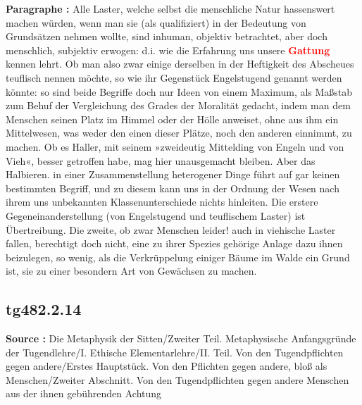 \documentclass[a4paper,12pt,twoside]{book}
\newcommand{\match}[1]{\textcolor{red}{\textbf{#1}}}
\begin{document}
	\textbf{Paragraphe : }Alle Laster, welche selbst die menschliche Natur hassenswert machen würden, wenn man sie (als qualifiziert) in der Bedeutung von Grundsätzen nehmen wollte, sind inhuman, objektiv betrachtet, aber doch menschlich, subjektiv erwogen: d.i. wie die Erfahrung uns unsere \match{Gattung} kennen lehrt. Ob man also zwar einige derselben in der Heftigkeit des Abscheues teuflisch nennen möchte, so wie ihr Gegenstück Engelstugend genannt werden könnte: so sind beide Begriffe doch nur Ideen von einem Maximum, als Maßstab zum Behuf der Vergleichung des Grades der Moralität gedacht, indem man dem Menschen seinen Platz im Himmel oder der Hölle anweiset, ohne aus ihm ein Mittelwesen, was weder den einen dieser Plätze, noch den anderen einnimmt, zu machen. Ob es Haller, mit seinem »zweideutig Mittelding von Engeln und von Vieh«, besser getroffen habe, mag hier unausgemacht bleiben. Aber das Halbieren. in einer Zusammenstellung heterogener Dinge führt auf gar keinen bestimmten Begriff, und zu diesem kann uns in der Ordnung der Wesen nach ihrem uns unbekannten Klassenunterschiede nichts hinleiten. Die erstere Gegeneinanderstellung (von Engelstugend und teuflischem  Laster) ist Übertreibung. Die zweite, ob zwar Menschen leider! auch in viehische Laster fallen, berechtigt doch nicht, eine zu ihrer Spezies gehörige Anlage dazu ihnen beizulegen, so wenig, als die Verkrüppelung einiger Bäume im Walde ein Grund ist, sie zu einer besondern Art von Gewächsen zu machen. 
	
	\subsection*{tg482.2.14} 
	\textbf{Source : }Die Metaphysik der Sitten/Zweiter Teil. Metaphysische Anfangsgründe der Tugendlehre/I. Ethische Elementarlehre/II. Teil. Von den Tugendpflichten gegen andere/Erstes Hauptstück. Von den Pflichten gegen andere, bloß als Menschen/Zweiter Abschnitt. Von den Tugendpflichten gegen andere Menschen aus der ihnen gebührenden Achtung\\  
	
\end{document}
